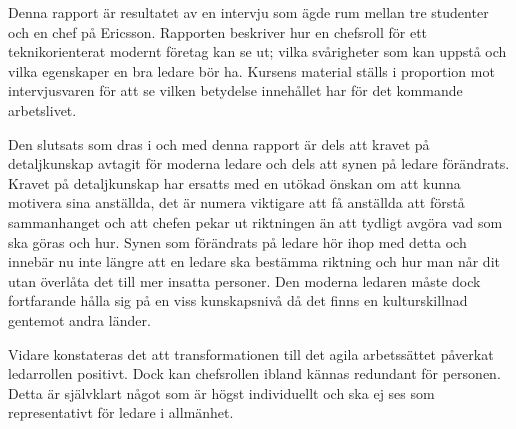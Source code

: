 
Denna rapport är resultatet av en intervju som ägde rum mellan tre studenter och en chef på Ericsson. Rapporten beskriver hur en chefsroll för ett teknikorienterat modernt företag kan se ut; vilka svårigheter som kan uppstå och vilka egenskaper en bra ledare bör ha. Kursens material ställs i proportion mot intervjusvaren för att se vilken betydelse innehållet har för det kommande arbetslivet.

Den slutsats som dras i och med denna rapport är dels att kravet på detaljkunskap avtagit för moderna ledare och dels att synen på ledare förändrats. Kravet på detaljkunskap har ersatts med en utökad önskan om att kunna motivera sina anställda, det är numera viktigare att få anställda att förstå sammanhanget och att chefen pekar ut riktningen än att tydligt avgöra vad som ska göras och hur. Synen som förändrats på ledare hör ihop med detta och innebär nu inte längre att en ledare ska bestämma riktning och hur man når dit utan överlåta det till mer insatta personer. Den moderna ledaren måste dock fortfarande hålla sig på en viss kunskapsnivå då det finns en kulturskillnad gentemot andra länder.

Vidare konstateras det att transformationen till det agila arbetssättet påverkat ledarrollen positivt. Dock kan chefsrollen ibland kännas redundant för personen. Detta är självklart något som är högst individuellt och ska ej ses som representativt för ledare i allmänhet.